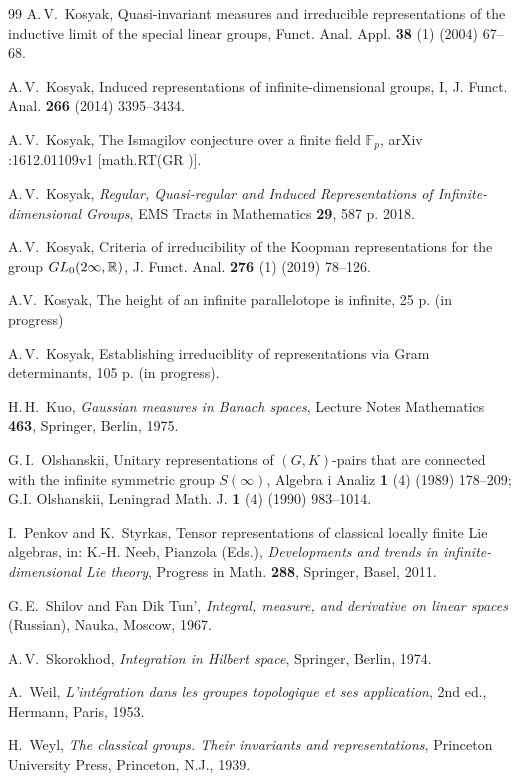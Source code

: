 \documentclass[preprint,12pt]{elsarticle}
\numberwithin{equation}{section}
\begin{document}
\begin{thebibliography}{99}
  A.\,V.~Kosyak, Quasi-invariant measures and irreducible representations of the inductive limit of the special linear groups, 
Funct. Anal. Appl. {\bf 38} (1) (2004) 67--68. 




 A.\,V.~Kosyak, Induced representations of infinite-dimensional groups, I,
J. Funct. Anal. {\bf 266} (2014) 3395--3434. 



 A.\,V.~Kosyak,  The Ismagilov conjecture over a finite field ${\mathbb F}_p$, arXiv :1612.01109v1 [math.RT(GR )].



 A.\,V.~Kosyak, {\it Regular, Quasi-regular and Induced Representations of Infinite-dimensional Groups},
 EMS Tracts in Mathematics {\bf 29}, 587 p. 2018.

A.\,V.~Kosyak,
Criteria of irreducibility of the Koopman representations for the group ${\rm GL}_0(2\infty,{\mathbb R})$,  J. Funct. Anal. {\bf 276} (1) (2019) 78--126.

 A.V.~Kosyak, The height of an infinite   parallelotope 
is infinite, 25 p. (in progress) 


 A.\,V.~Kosyak, Establishing irreduciblity of representations via Gram determinants, 105 p.
(in progress).

 H.\,H.~Kuo, {\it Gaussian measures in Banach spaces}, Lecture Notes Mathematics {\bf 463}, Springer, Berlin, 1975. 





G.\,I.~Olshanskii, Unitary representations of $(G,K)$-pairs that are connected with the infinite symmetric group $S(\infty)$, 
Algebra i Analiz {\bf 1} (4) (1989) 178--209; G.I. Olshanskii, Leningrad Math. J. {\bf 1} (4) (1990) 983--1014. 



 I.~Penkov and K.~Styrkas,   Tensor representations of classical locally finite Lie algebras, in: K.-H. Neeb, Pianzola (Eds.), 
{\it Developments and trends in infinite-dimensional Lie theory}, Progress in Math. {\bf 288}, Springer, Basel, 2011. 



 G.\,E.~Shilov and Fan Dik Tun',
{\it Integral, measure, and derivative on linear spaces} (Russian), Nauka, Moscow, 1967. 

 A.\,V.~Skorokhod, {\it Integration in Hilbert space}, Springer, Berlin, 1974. 



 A.~Weil,  {\it L'int\'egration dans les groupes topologique et ses application}, 2nd ed., Hermann, Paris, 1953. 




 H.~Weyl, {\it The classical groups. Their invariants and representations}, Princeton University Press, Princeton, N.J., 1939.




\end{thebibliography}
\end{document}
